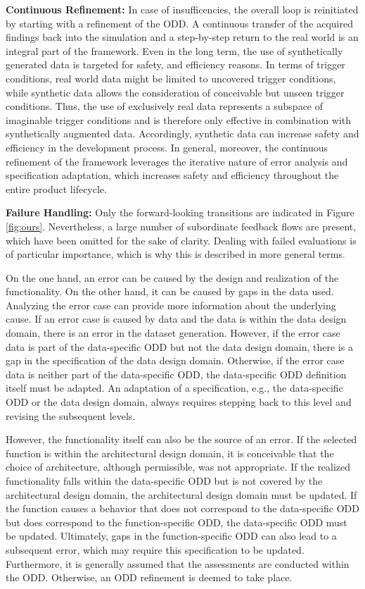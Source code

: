 \textbf{Continuous Refinement:} In case of insufficencies, the overall loop is reinitiated by starting with a refinement of the ODD. A continuous transfer of the acquired findings back into the simulation and a step-by-step return to the real world is an integral part of the framework. Even in the long term, the use of synthetically generated data is targeted for safety, and efficiency reasons. In terms of trigger conditions, real world data might be limited to uncovered trigger conditions, while synthetic data allows the consideration of conceivable but unseen trigger conditions. Thus, the use of exclusively real data represents a subspace of imaginable trigger conditions and is therefore only effective in combination with synthetically augmented data. Accordingly, synthetic data can increase safety and efficiency in the development process. In general, moreover, the continuous refinement of the framework leverages the iterative nature of error analysis and specification adaptation, which increases safety and efficiency throughout the entire product lifecycle.

\textbf{Failure Handling:} Only the forward-looking transitions are indicated in Figure \ref{fig:ours}. Nevertheless, a large number of subordinate feedback flows are present, which have been omitted for the sake of clarity. Dealing with failed evaluations is of particular importance, which is why this is described in more general terms. 

On the one hand, an error can be caused by the design and realization of the functionality. On the other hand, it can be caused by gaps in the data used. Analyzing the error case can provide more information about the underlying cause. If an error case is caused by data and the data is within the data design domain, there is an error in the dataset generation. However, if the error case data is part of the data-specific ODD but not the data design domain, there is a gap in the specification of the data design domain. Otherwise, if the error case data is neither part of the data-specific ODD, the data-specific ODD definition itself must be adapted. An adaptation of a specification, e.g., the data-specific ODD or the data design domain, always requires stepping back to this level and revising the subsequent levels.

However, the functionality itself can also be the source of an error. If the selected function is within the architectural design domain, it is conceivable that the choice of architecture, although permissible, was not appropriate. If the realized functionality falls within the data-specific ODD but is not covered by the architectural design domain, the architectural design domain must be updated. If the function causes a behavior that does not correspond to the data-specific ODD but does correspond to the function-specific ODD, the data-specific ODD must be updated. Ultimately, gaps in the function-specific ODD can also lead to a subsequent error, which may require this specification to be updated. Furthermore, it is generally assumed that the assessments are conducted within the ODD. Otherwise, an ODD refinement is deemed to take place.

